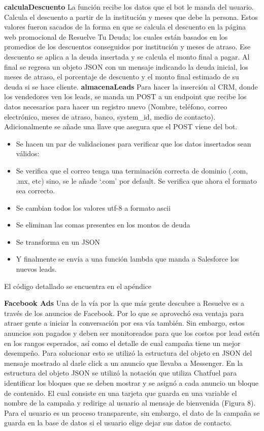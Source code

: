 \textbf{calculaDescuento}
La función recibe los datos que el bot le manda del usuario. Calcula el descuento a partir de la institución y meses que debe la persona. Estos valores fueron sacados de la forma en que se calcula el descuento en la página web promocional de Resuelve Tu Deuda; los cuales están basados en los promedios de los descuentos conseguidos por institución y meses de atraso.  Ese descuento se aplica a la deuda insertada y se calcula el monto final a pagar. Al final se regresa un objeto JSON con un mensaje indicando la deuda inicial, los meses de atraso, el porcentaje de descuento y el monto final estimado de su deuda si se hace cliente.
\textbf{almacenaLeads}
Para hacer la inserción al CRM, donde los vendedores ven los leads, se manda un POST a un endpoint que recibe los datos necesarios para hacer un registro nuevo (Nombre, teléfono, correo electrónico, meses de atraso, banco, system\_id, medio de contacto). Adicionalmente se añade una llave que asegura que el POST viene del bot.
\begin{itemize}
\item Se hacen un par de validaciones para verificar que los datos insertados sean válidos:
\item Se verifica que el correo tenga una terminación correcta de dominio (.com, .mx, etc) sino, se le añade ‘.com’ por default. Se verifica que ahora el formato sea correcto.
\item Se cambian todos los valores utf-8 a formato ascii
\item Se eliminan las comas presentes en los montos de deuda
\item Se transforma en un JSON
\item Y finalmente se envía a una función lambda que manda a Salesforce los nuevos leads.
\end{itemize}
El código detallado se encuentra en el apéndice

\textbf{Facebook Ads}
Una de la vía por la que más gente descubre a Resuelve es a través de los anuncios de Facebook. Por lo que se aprovechó esa ventaja para atraer gente a iniciar la conversación por esa vía también. Sin embargo, estos anuncios son pagados y deben ser monitoreados para que los costos por lead estén en los rangos esperados, así como el detalle de cual campaña tiene un mejor desempeño. Para solucionar esto se utilizó la estructura del objeto en JSON del mensaje mostrado al darle click a un anuncio que llevaba a Messenger. 
En la estructura del objeto JSON se utilizó la notación que utiliza Chatfuel para identificar los bloques que se deben mostrar y se asignó a cada anuncio un bloque de contenido. El cual consiste en una tarjeta que guarda en una variable el nombre de la campaña y redirige al usuario al mensaje de bienvenida (Figura 8). Para el usuario es un proceso transparente, sin embargo, el dato de la campaña se guarda en la base de datos si el usuario elige dejar sus datos de contacto.\cite{friedrich} 

